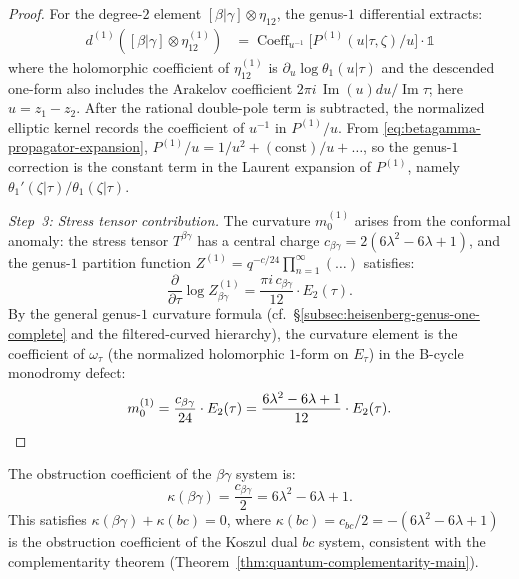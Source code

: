 \begin{proof}
For the degree-$2$ element $[\beta|\gamma] \otimes \eta_{12}$,
the genus-$1$ differential extracts:
\begin{align}\label{eq:genus1-bar-betagamma-deg2}
d^{(1)}([\beta|\gamma] \otimes \eta_{12}^{(1)})
&=
\operatorname{Coeff}_{u^{-1}}
\bigl[P^{(1)}(u|\tau,\zeta)/u\bigr]
\cdot \mathbb{1}
\end{align}
where the holomorphic coefficient of $\eta_{12}^{(1)}$ is
$\partial_u\log\theta_1(u|\tau)$ and the descended one-form also
includes the Arakelov coefficient
$2\pi i\,\operatorname{Im}(u)d u/\operatorname{Im}\tau$; here
$u=z_1-z_2$. After the rational double-pole term is subtracted,
the normalized elliptic kernel records the coefficient of $u^{-1}$ in
$P^{(1)}/u$. From
\eqref{eq:betagamma-propagator-expansion},
$P^{(1)}/u = 1/u^2 + (\text{const})/u + \ldots$,
so the genus-$1$ correction is the constant term in the Laurent
expansion of $P^{(1)}$, namely
$\theta_1'(\zeta|\tau)/\theta_1(\zeta|\tau)$.

\emph{Step~3: Stress tensor contribution.}
The curvature $m_0^{(1)}$ arises from the conformal anomaly: the
stress tensor $T^{\beta\gamma}$ has a central charge
$c_{\beta\gamma} = 2(6\lambda^2 - 6\lambda + 1)$, and the genus-$1$
partition function $Z^{(1)} = q^{-c/24} \prod_{n=1}^\infty
(\ldots)$ satisfies:
\begin{equation}\label{eq:dlog-Z}
\frac{\partial}{\partial \tau} \log Z^{(1)}_{\beta\gamma}
= \frac{\pi i \, c_{\beta\gamma}}{12} \cdot E_2(\tau).
\end{equation}
By the general genus-$1$ curvature formula
(cf.\ \S\ref{subsec:heisenberg-genus-one-complete} and
the filtered-curved hierarchy), the curvature element is the
coefficient of $\omega_\tau$ (the normalized holomorphic $1$-form
on $E_\tau$) in the B-cycle monodromy defect:
\[
m_0^{(1)} = \frac{c_{\beta\gamma}}{24} \cdot E_2(\tau)
= \frac{6\lambda^2 - 6\lambda + 1}{12} \cdot E_2(\tau). \qedhere
\]
\end{proof}

\begin{proposition}
\label{prop:betagamma-obstruction-coefficient}
The obstruction coefficient of the $\beta\gamma$ system is:
\begin{equation}\label{eq:betagamma-kappa}
\kappa(\beta\gamma) = \frac{c_{\beta\gamma}}{2}
= 6\lambda^2 - 6\lambda + 1.
\end{equation}
This satisfies $\kappa(\beta\gamma) + \kappa(bc) = 0$, where
$\kappa(bc) = c_{bc}/2 = -(6\lambda^2 - 6\lambda + 1)$ is the
obstruction coefficient of the Koszul dual $bc$ system, consistent
with the complementarity theorem
(Theorem~\ref{thm:quantum-complementarity-main}).
\end{proposition}

